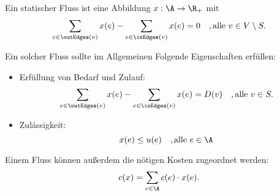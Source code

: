 \begin{definition}
    Ein statischer Fluss ist eine Abbildung $x : \A \rightarrow \R_+$ mit
    \[ \sum_{e \in \outEdges(v)} x(e) - \sum_{e \in \inEdges(v)} x(e) = 0 \quad, \text{alle } v \in V \setminus S. \]
    
    Ein solcher Fluss sollte im Allgemeinen Folgende Eigenschaften erfüllen:
    \begin{itemize}
        \item Erfüllung von Bedarf und Zulauf:
            \[ \sum_{e \in \outEdges(v)} x(e) - \sum_{e \in \inEdges(v)} x(e) = D(v) \quad, \text{alle } v \in S. \]
        \item Zulässigkeit:
            \[ x(e) \leq u(e) \quad, \text{alle } e \in \A \]
    \end{itemize}
    
    Einem Fluss können außerdem die nötigen Kosten zugeordnet werden:
        \[ c(x) = \sum_{e \in \A} c(e) \cdot x(e). \]
\end{definition}
